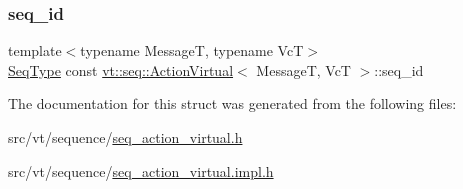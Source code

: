 \subsubsection{\texorpdfstring{seq\+\_\+id}{seq\_id}}
{\footnotesize\ttfamily template$<$typename MessageT, typename VcT$>$ \\
\hyperlink{namespacevt_1_1seq_a3b612da217ac669d39c159f134ab8434}{Seq\+Type} const \hyperlink{structvt_1_1seq_1_1_action_virtual}{vt\+::seq\+::\+Action\+Virtual}$<$ MessageT, VcT $>$\+::seq\+\_\+id}



The documentation for this struct was generated from the following files\+:\begin{DoxyCompactItemize}
\item 
src/vt/sequence/\hyperlink{seq__action__virtual_8h}{seq\+\_\+action\+\_\+virtual.\+h}\item 
src/vt/sequence/\hyperlink{seq__action__virtual_8impl_8h}{seq\+\_\+action\+\_\+virtual.\+impl.\+h}\end{DoxyCompactItemize}
